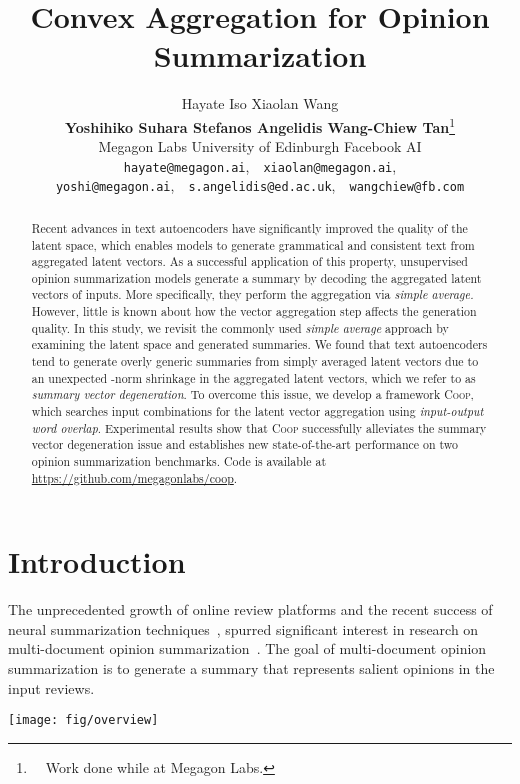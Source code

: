 \documentclass[11pt]{article}
\title{Convex Aggregation for Opinion Summarization}
\author{
Hayate Iso \quad
Xiaolan Wang \\
\textbf{Yoshihiko Suhara \quad
Stefanos Angelidis \quad
Wang-Chiew Tan}\thanks{~~Work done while at Megagon Labs.} \\
Megagon Labs \quad
University of Edinburgh \quad
Facebook AI\\
\texttt{hayate@megagon.ai},~~\texttt{xiaolan@megagon.ai},\\
\texttt{yoshi@megagon.ai},~~\texttt{s.angelidis@ed.ac.uk},~~\texttt{wangchiew@fb.com}}
\newcommand{\aggname}{\textsc{Coop}}
\newcommand{\hl}[1]{#1}
\begin{document}
\maketitle
\begin{abstract}
Recent advances in text autoencoders have significantly improved the quality of the latent space, which enables models to generate \hl{grammatical and consistent} text from aggregated latent vectors.
As a successful application of this property, unsupervised opinion summarization models generate a summary by decoding the aggregated latent vectors of inputs. More specifically, they perform the aggregation via {\em simple average.}
However, little is known about how the vector aggregation step affects the generation quality.
In this study, we revisit the commonly used {\em simple average} approach by examining the latent space and generated summaries. We found that text autoencoders tend to generate overly generic summaries from simply averaged latent vectors due to an unexpected -norm shrinkage in the aggregated latent vectors, which we refer to as {\em summary vector degeneration}.
To overcome this issue, we develop a framework \aggname, which searches input combinations for the latent vector aggregation using {\em input-output word overlap}. Experimental results show that \aggname{} successfully alleviates the summary vector degeneration issue and establishes new state-of-the-art performance on two opinion summarization benchmarks.
Code is available at \url{https://github.com/megagonlabs/coop}.
\end{abstract}

\section{Introduction}
The unprecedented growth of online review platforms and the recent success of neural summarization techniques~\cite{cheng-lapata-2016-neural,see-etal-2017-get,liu-lapata-2019-hierarchical},
spurred significant interest in research on multi-document opinion summarization~\cite{angelidis-lapata-2018-summarizing,Chu:2019:MeanSum,brazinskas-etal-2020-unsupervised,suhara-etal-2020-opiniondigest,amplayo-lapata-2020-unsupervised,amplayo2021unsupervised}.
The goal of multi-document opinion summarization is
to generate a summary that represents salient opinions in the input reviews.

\begin{figure*}[t]
    \centering
    \texttt{[image: fig/overview]}
    \caption{
    Illustration of the latent space  and text space .
    The de facto standard approach in unsupervised opinion summarization uses the simple average of input review vectors  () to obtain the summary vector  ().
    The simply averaged vector  tends to be close to the center (i.e., has a small -norm) in the latent space, and a generated summary 
    () tends to become overly generic.
    Our proposed framework \aggname{} finds a better aggregated vector to generate a more specific summary () from the latent vector  ().}
    \label{fig:overview}
\end{figure*}
\end{document}
